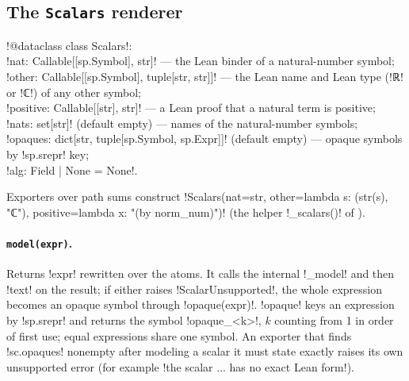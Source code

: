 {{{\subsection{The \texttt{Scalars} renderer}

\begin{signature}
\lexpy!@dataclass class Scalars!:\\
\quad \lexpy!nat: Callable[[sp.Symbol], str]! --- the Lean binder of a natural-number symbol;\\
\quad \lexpy!other: Callable[[sp.Symbol], tuple[str, str]]! --- the Lean name and Lean type
(\lexlean!ℝ! or \lexlean!ℂ!) of any other symbol;\\
\quad \lexpy!positive: Callable[[str], str]! --- a Lean proof that a natural term is positive;\\
\quad \lexpy!nats: set[str]! (default empty) --- names of the natural-number symbols;\\
\quad \lexpy!opaques: dict[str, tuple[sp.Symbol, sp.Expr]]! (default empty) --- opaque symbols by
\lexpy!sp.srepr! key;\\
\quad \lexpy!alg: Field | None = None!.
\end{signature}
Exporters over path sums construct \lexpy!Scalars(nat=str, other=lambda s: (str(s), "ℂ"), positive=lambda x: "(by norm_num)")! (the helper \lexpy!_scalars()! of
).

\paragraph{\texttt{model(expr)}.} Returns \lexpy!expr! rewritten over the atoms. It calls the
internal \lexpy!_model! and then \lexpy!text! on the result; if either raises
\lexcode!ScalarUnsupported!, the whole expression becomes an opaque symbol through
\lexpy!opaque(expr)!. \lexpy!opaque! keys an expression by \lexpy!sp.srepr! and returns the symbol
\lexcode!opaque_<k>!, $k$ counting from 1 in order of first use; equal expressions share one
symbol. An exporter that finds \lexpy!sc.opaques! nonempty after modeling a scalar it must
state exactly raises its own unsupported error (for example \lexcode!the scalar ... has no exact Lean form!).

}}}
